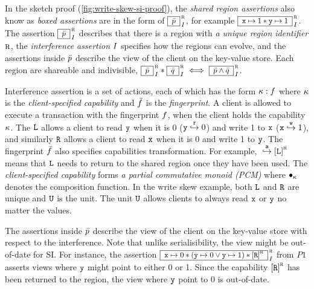 In the sketch proof (\cref{fig:write-skew-si-proof}), the \emph{shared region assertions} also know as \emph{boxed assertions} are in the form of \( \boxass{\bar{\lpre}}{\lrid}{\intass}\), for example \( \boxass{\vx \pt 1 \sep \vy \pt 1}{\lrid}{\intass} \).
The assertion \( \boxass{\bar{\lpre}}{\lrid}{\intass}\) describes that there is a region with \emph{a unique region identifier} \( \lrid \),
the \emph{interference assertion} \( I \) specifies how the regions can evolve,
and the assertions inside \( \bar{p} \) describe the view of the client on the key-value store.
Each region are shareable and indivisible, \ie \( \boxass{\bar{\lpre}}{\lrid}{\intass} \sep \boxass{\bar{\lpost}}{\lrid}{\intass} \iff \boxass{\bar{\lpre} \land \bar{\lpost}}{\lrid}{\intass}\).

Interference assertion is a set of actions, each of which has the form \( \kappa : f \) where \( \kappa \) is the \emph{client-specified capability} and \( \bar{f} \) is the \emph{fingerprint}.
A client is allowed to execute a transaction with the fingerprint \( f \), when the client holds the capability \( \kappa \).
The \( \texttt{L}\) allows a client to read \( \texttt{y} \) when it is 0 (\(\texttt{y} \stackrel{\texttt{r}}{\hookrightarrow} 0\)) and write 1 to \( \texttt{x} \) (\(\texttt{x} \stackrel{\texttt{w}}{\hookrightarrow} 1\)),
and similarly \( \texttt{R} \) allows a client to read \( \texttt{x} \) when it is 0 and write 1 to \( \texttt{y} \).
The fingerprint \( \bar{f} \) also specifies capabilities transformation.
For example, \( \null \fpA \cass{\CB{L}}{\lrid} \) means that \( \texttt{L} \) needs to return to the shared region once they have been used.
The \emph{client-specified capability} forms \emph{a partial commutative monoid (PCM)} where \( \bullet_{\kappa} \) denotes the composition function.
In the write skew example, both \( \texttt{L} \) and \( \texttt{R} \) are unique and \( \texttt{U} \) is the unit.
The unit \( \texttt{U} \) allows clients to always read \( \texttt{x} \) or \( \texttt{y} \) no matter the values.

The assertions inside \( \bar{p} \) describe the view of the client on the key-value store with respect to the interference.
Note that unlike serialisibility, the view might be out-of-date for SI.
For instance, the assertion \( \boxass{\vx \pt 0 \sep ( \vy \pt 0 \lor \vy \pt 1 ) \sep \cass{\CB{R}}{\lrid} }{\lrid}{\intass}\) from \( P1 \) asserts views where \( \texttt{y} \) might point to either 0 or 1.
Since the capability \( \cass{\CB{R}}{\lrid} \) has been returned to the region, the view where \( \texttt{y} \) point to 0 is out-of-date.

